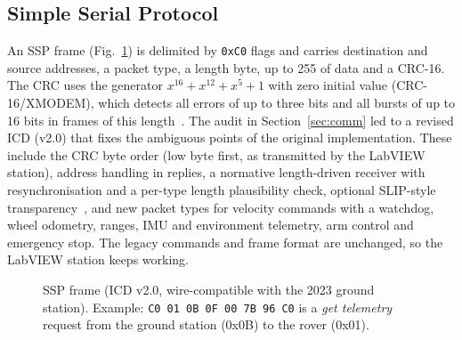 \documentclass[conference]{IEEEtran}
\begin{document}
\subsection{Simple Serial Protocol}
An SSP frame (Fig.~\ref{fig:ssp}) is delimited by \texttt{0xC0} flags and carries destination and source addresses, a packet type, a length byte, up to \SI{255}{\byte} of data and a CRC-16. The CRC uses the generator $x^{16}+x^{12}+x^5+1$ with zero initial value (CRC-16/XMODEM), which detects all errors of up to three bits and all bursts of up to 16 bits in frames of this length~\cite{peterson1961,koopman2004}. The audit in Section~\ref{sec:comm} led to a revised ICD (v2.0) that fixes the ambiguous points of the original implementation. These include the CRC byte order (low byte first, as transmitted by the LabVIEW station), address handling in replies, a normative length-driven receiver with resynchronisation and a per-type length plausibility check, optional SLIP-style transparency~\cite{rfc1055}, and new packet types for velocity commands with a watchdog, wheel odometry, ranges, IMU and environment telemetry, arm control and emergency stop. The legacy commands and frame format are unchanged, so the LabVIEW station keeps working.

\begin{figure}[t]
\centering
{}
\caption{SSP frame (ICD v2.0, wire-compatible with the 2023 ground station). Example: \texttt{C0 01 0B 0F 00 7B 96 C0} is a \emph{get telemetry} request from the ground station (0x0B) to the rover (0x01).}
\label{fig:ssp}
\end{figure}
\end{document}

